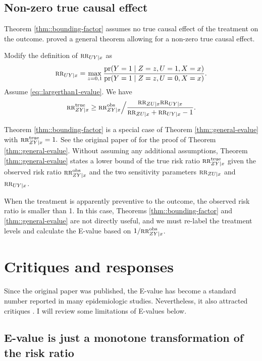 \subsection{Non-zero true causal effect}
 
Theorem \ref{thm::bounding-factor} assumes no true causal effect of the treatment on the outcome. \citet{ding2016sensitivity} proved a general theorem allowing for a non-zero true causal effect.


\begin{theorem}
\label{thm::general-evalue}
Modify the definition of  $\textsc{rr}_{UY\mid x}   $ as
$$
 \textsc{rr}_{UY\mid x}  =  \max_{z=0,1} \frac{  \textup{pr}(Y=1\mid Z=z, U=1, X=x) }{  \textup{pr}(Y=1\mid Z=z, U=0, X=x) }.
$$
Assume \eqref{eq::largerthan1-evalue}. 
We have 
$$
\textsc{rr}_{ZY\mid x}^{\textup{true}} \geq 
\textsc{rr}_{ZY\mid x}^{\textup{obs}} \Big /  \frac{ \textsc{rr}_{ZU\mid x}  \textsc{rr}_{UY\mid x} }{  \textsc{rr}_{ZU\mid x} + \textsc{rr}_{UY\mid x} - 1} .
$$
\end{theorem}

Theorem \ref{thm::bounding-factor} is a special case of  Theorem \ref{thm::general-evalue} with $\textsc{rr}_{ZY\mid x}^{\textup{true}}   = 1.$
See the original paper of \citet{ding2016sensitivity} for the proof of Theorem \ref{thm::general-evalue}.  Without assuming any additional assumptions, Theorem \ref{thm::general-evalue} states a lower bound of the true risk ratio $\textsc{rr}_{ZY\mid x}^{\textup{true}}$ given the observed risk ratio $\textsc{rr}_{ZY\mid x}^{\textup{obs}}$ and the two sensitivity parameters $\textsc{rr}_{ZU\mid x} $ and $ \textsc{rr}_{UY\mid x}$. 


When the treatment is apparently preventive to the outcome, the observed risk ratio is smaller than 1. In this case, Theorems \ref{thm::bounding-factor} and \ref{thm::general-evalue} are not directly useful, and we must re-label the treatment levels and calculate the E-value based on $1/ \textsc{rr}_{ZY\mid x}^{\textup{obs}}$. 




\section{Critiques and responses}

Since the original paper was published,  the E-value has become a standard number reported in many epidemiologic studies. Nevertheless, it also attracted critiques \citep{ioannidis2019limitations}. I will review some limitations of E-values below. 



\subsection{E-value is just a monotone transformation of the risk ratio}
\label{sec::evalue-monotone}

